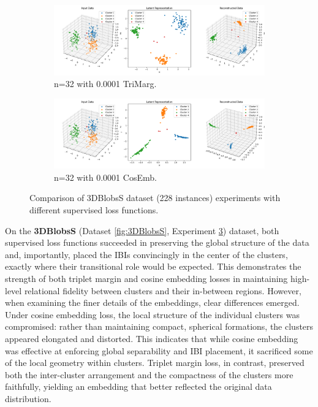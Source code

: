 \begin{figure}[htbp]
  \centering
  \begin{subfigure}[b]{1.0\textwidth}
    \centering
    \includegraphics[width=\linewidth]{images/RQ3/tri/3DBlobsS_32_0.0001.png}
    \caption{n=32 with 0.0001 TriMarg.}
    \label{fig:RQ3/tri/3DBlobsS}
  \end{subfigure}
  \hfill
  \begin{subfigure}[b]{1.0\textwidth}
    \centering
    \includegraphics[width=\linewidth]{images/RQ3/cos/3DBlobsS_32_0.0001.png}
    \caption{n=32 with 0.0001 CosEmb.}
    \label{fig:RQ3/cos/3DBlobsS}
  \end{subfigure} 

  \caption{Comparison of 3DBlobsS dataset (228 instances) experiments with different
supervised loss functions.}
  \label{fig:RQ3/3DBlobsS}
\end{figure}

On the \textbf{3DBlobsS} (Dataset \ref{fig:3DBlobsS}, Experiment \ref{fig:RQ3/3DBlobsS}) dataset, both supervised loss functions succeeded in preserving the global structure of the data and, importantly, placed the IBIs convincingly in the center of the clusters, exactly where their transitional role would be expected. This demonstrates the strength of both triplet margin and cosine embedding losses in maintaining high-level relational fidelity between clusters and their in-between regions. However, when examining the finer details of the embeddings, clear differences emerged. Under cosine embedding loss, the local structure of the individual clusters was compromised: rather than maintaining compact, spherical formations, the clusters appeared elongated and distorted. This indicates that while cosine embedding was effective at enforcing global separability and IBI placement, it sacrificed some of the local geometry within clusters. Triplet margin loss, in contrast, preserved both the inter-cluster arrangement and the compactness of the clusters more faithfully, yielding an embedding that better reflected the original data distribution.

